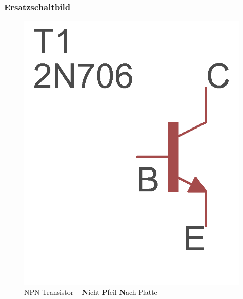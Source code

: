 \begin{frame}
\frametitle{Ersatzschaltbild}

\begin{minipage}{0.4\textwidth}
	 \begin{figure}
      \includegraphics[width=\textwidth,height=.5\textheight,keepaspectratio]{e13/NPN.png}
      \caption{NPN Transistor -- \textbf{N}icht \textbf{P}feil \textbf{N}ach Platte}
    \end{figure}
\end{minipage}
\hspace{0.5cm}
\begin{minipage}{0.4\textwidth}
	 \begin{figure}

\end{figure}
\end{minipage}
\end{frame}
